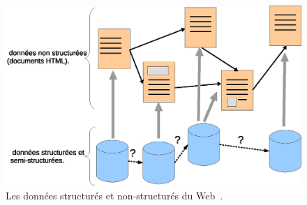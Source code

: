 \begin{figure}[h]
    \centering
    \includegraphics[width=1\textwidth]{figs/A/structured-and-unstructured-data-on-the-web.eps}
    \caption{Les données structurés et non-structurés du
      Web~\cite{antoniou2012semantic}.}\label{fig:structured-and-unstructured-data-on-the-web}
\end{figure}
